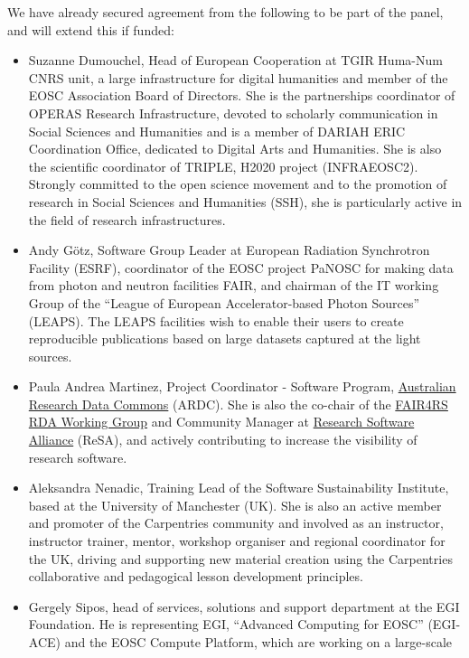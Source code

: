 We have already secured agreement from the following to be part of the panel,
and will extend this if funded:
\begin{itemize}
\item Suzanne Dumouchel, Head of European Cooperation at TGIR Huma-Num CNRS unit, a large infrastructure for
digital humanities and member of the EOSC Association Board of Directors. She is the partnerships coordinator
of OPERAS Research Infrastructure, devoted to scholarly communication in Social Sciences and Humanities and is a member of DARIAH ERIC Coordination Office,
dedicated to Digital Arts and Humanities. She is also the scientific coordinator of TRIPLE, H2020 project
(INFRAEOSC2). Strongly committed to the open science movement and to the promotion of research in Social Sciences
and Humanities (SSH), she is particularly active in the field of research infrastructures.
\item Andy Götz, Software Group Leader at European Radiation Synchrotron
  Facility (ESRF), coordinator of the EOSC project PaNOSC for making data from
  photon and neutron facilities FAIR, and chairman of the IT working Group of
  the ``League of European Accelerator-based Photon Sources'' (LEAPS). The LEAPS
  facilities wish to enable their users to create reproducible publications
  based on large datasets captured at the light sources.
\item Paula Andrea Martinez, Project Coordinator - Software Program, \href{https://ardc.edu.au/}{Australian Research Data Commons} (ARDC).
She is also the co-chair of the \href{https://www.rd-alliance.org/groups/fair-research-software-fair4rs-wg}{FAIR4RS RDA Working Group} and
Community Manager at \href{https://www.researchsoft.org/}{Research Software Alliance} (ReSA), and actively contributing
to increase the visibility of research software.
\item Aleksandra Nenadic, Training Lead of the Software Sustainability Institute,
based at the University of Manchester (UK). She is also an active member and
promoter of the Carpentries community and involved as an instructor,
instructor trainer, mentor, workshop organiser and regional coordinator
for the UK, driving and supporting new material creation using the
Carpentries collaborative and pedagogical lesson development principles.
\item Gergely Sipos, head of services, solutions and support department at the
  EGI Foundation. He is representing EGI, ``Advanced Computing for EOSC''
  (EGI-ACE) and the EOSC Compute Platform, which are working on a large-scale

\end{itemize}
